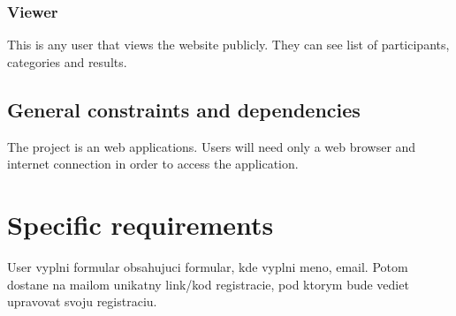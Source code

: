 \documentclass[a4paper]{article}
\begin{document}
	\subsubsection{Viewer}
	This is any user that views the website publicly. They can see list of participants, categories and results. 

	\subsection{General constraints and dependencies}
	\label{sub:constraints}
	The project is an web applications. Users will need only a web browser and internet connection in order to access the application.
	
	\newpage
	
	\section{Specific requirements}
	\label{sec:specific}
	
	User vyplni formular obsahujuci formular, kde vyplni meno, email. Potom dostane na mailom unikatny link/kod registracie, pod ktorym bude vediet upravovat svoju registraciu.
\end{document}
